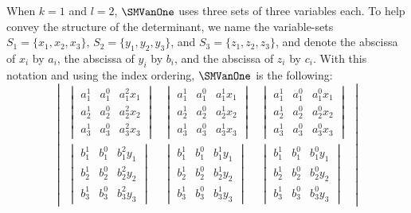 \documentclass{toc}
\begin{document}
\begin{example}
  \label{ex.smvan1.k1l2}
  When \(k=1\) and \(l=2\), \(\SMVanOne\) uses three sets of three
  variables each.
  To help convey the structure of the determinant,
  we name the variable-sets
  \(S_1 = \{x_1,x_2,x_3\}\),
  \(S_2 = \{y_1,y_2,y_3\}\), and
  \(S_3 = \{z_1,z_2,z_3\}\),
  and denote the abscissa of \(x_i\) by \(a_i\),
  the abscissa of \(y_i\) by \(b_i\),
  and the abscissa of \(z_i\) by \(c_i\).
  With this notation and using the index ordering, \(\SMVanOne\) is the following:
  \begingroup\renewcommand{\arraystretch}{1.5}
  \[
    \begin{vmatrix*}
      \begin{vmatrix*}
        a_1^1 & a_1^0 & a_1^2 x_1 \\
        a_2^1 & a_2^0 & a_2^2 x_2 \\
        a_3^1 & a_3^0 & a_3^2 x_3
      \end{vmatrix*}
      &
      \begin{vmatrix*}
        a_1^1 & a_1^0 & a_1^1 x_1 \\
        a_2^1 & a_2^0 & a_2^1 x_2 \\
        a_3^1 & a_3^0 & a_3^1 x_3 
      \end{vmatrix*}
      &
      \begin{vmatrix*}
        a_1^1 & a_1^0 & a_1^0 x_1 \\
        a_2^1 & a_2^0 & a_2^0 x_2 \\
        a_3^1 & a_3^0 & a_3^0 x_3 
      \end{vmatrix*}
      \\
      \begin{vmatrix*}
        b_1^1 & b_1^0 & b_1^2 y_1 \\
        b_2^1 & b_2^0 & b_2^2 y_2 \\
        b_3^1 & b_3^0 & b_3^2 y_3 
      \end{vmatrix*}
      &
      \begin{vmatrix*}
        b_1^1 & b_1^0 & b_1^1 y_1 \\
        b_2^1 & b_2^0 & b_2^1 y_2 \\
        b_3^1 & b_3^0 & b_3^1 y_3 
      \end{vmatrix*}
      &
      \begin{vmatrix*}
        b_1^1 & b_1^0 & b_1^0 y_1 \\
        b_2^1 & b_2^0 & b_2^0 y_2 \\
        b_3^1 & b_3^0 & b_3^0 y_3 
      \end{vmatrix*}

\end{vmatrix*}\]
\end{example}
\end{document}
